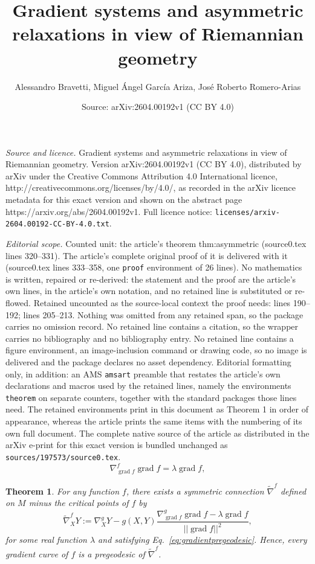 \documentclass[10pt,a4paper]{amsart}
\title{Gradient systems and asymmetric relaxations in view of Riemannian geometry}
\author{Alessandro Bravetti, Miguel \'Angel Garc\'ia Ariza, Jos\'e Roberto Romero-Arias}
\date{Source: arXiv:2604.00192v1 (CC BY 4.0)}
\newtheorem{theorem}{Theorem}
\begin{document}
\maketitle

\noindent\emph{Source and licence.} Gradient systems and asymmetric relaxations in view of Riemannian geometry. Version arXiv:2604.00192v1 (CC BY 4.0), distributed by arXiv under the Creative Commons Attribution 4.0 International licence, http://creativecommons.org/licenses/by/4.0/, as recorded in the arXiv licence metadata for this exact version and shown on the abstract page https://arxiv.org/abs/2604.00192v1. Full licence notice: \texttt{licenses/arxiv-2604.00192-CC-BY-4.0.txt}.\par\smallskip

\noindent\textit{Editorial scope.} Counted unit: the article's theorem thm:asymmetric (source0.tex lines 320--331). The article's complete original proof of it is delivered with it (source0.tex lines 333--358, one \texttt{proof} environment of 26 lines). No mathematics is written, repaired or re-derived: the statement and the proof are the article's own lines, in the article's own notation, and no retained line is substituted or re-flowed.  Retained uncounted as the source-local context the proof needs: lines 190--192; lines 205--213.  Nothing was omitted from any retained span, so the package carries no omission record.  No retained line contains a citation, so the wrapper carries no bibliography and no bibliography entry.  No retained line contains a figure environment, an image-inclusion command or drawing code, so no image is delivered and the package declares no asset dependency.  Editorial formatting only, in addition: an AMS \texttt{amsart} preamble that restates the article's own declarations and macros used by the retained lines, namely the environments \texttt{theorem} on separate counters, together with the standard packages those lines need.  The retained environments print in this document as Theorem 1 in order of appearance, whereas the article prints the same items with the numbering of its own full document.  The complete native source of the article as distributed in the arXiv e-print for this exact version is bundled unchanged as \texttt{sources/197573/source0.tex}.
\begin{equation}\label{eq:gradientpregeodesic}
    \nabla^f_{\operatorname{grad}f}\operatorname{grad}f=\lambda \operatorname{grad }f,
\end{equation}

\begin{theorem}\label{thm:main}
    For any function $f$, there exists a symmetric connection $\tilde\nabla^f$ defined on $M$ minus the critical points of $f$ by
    \begin{equation}\label{eq:nablaf}
        \tilde\nabla^f_XY:=\nabla^g_XY- 
        g(X,Y)\frac{\nabla^g_{\operatorname{grad}f}\operatorname{grad}f-\lambda\operatorname{grad }f}{||\operatorname{grad }f||^2},
    \end{equation}
    for some real function $\lambda$ and satisfying Eq.~\eqref{eq:gradientpregeodesic}. 
    Hence, every gradient curve of $f$ is a pregeodesic of $\tilde\nabla^f$.
\end{theorem}
\end{document}
